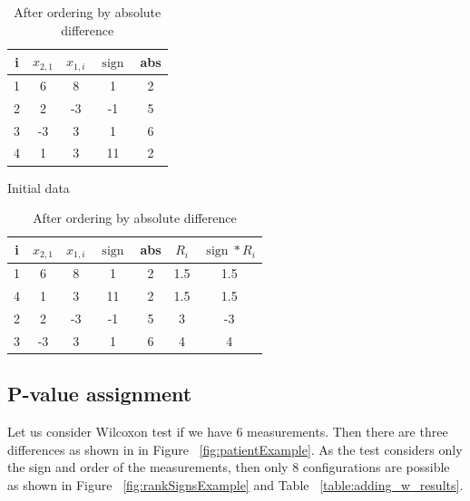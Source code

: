 \documentclass[12pt]{article}
\DeclareMathOperator{\sign}{sign}
\begin{document}
\begin{table}[h!]
  \begin{center}
    \begin{minipage}{.5\linewidth}
      \begin{center}
        \begin{tabular}{ccccc}
          \hline
          i & $x_{2, 1}$ & $x_{1, i}$ & $\sign$ & abs \\
          \hline
          1 & 6 & 8 & 1 & 2 \\
          \hline
          2 & 2 & -3 & -1 & 5 \\
          \hline
          3 & -3 & 3 & 1 & 6 \\
          \hline
          4 & 1 & 3 & 11 & 2 \\
          \hline
        \end{tabular}
        \caption{Initial data}
        \label{table:wilx_example_1}
      \end{center}
    \end{minipage}%
    \begin{minipage}{.5\linewidth}
      \begin{center}
        \begin{tabular}{ccccccc}
          \hline
          i & $x_{2, 1}$ & $x_{1, i}$ & $\sign$ & abs & $R_i$ & $\sign * R_i$ \\
          \hline
          1 & 6 & 8 & 1 & 2 & 1.5 & 1.5\\
          \hline
          4 & 1 & 3 & 11 & 2 & 1.5 & 1.5\\
          \hline
          2 & 2 & -3 & -1 & 5 & 3 & -3 \\
          \hline
          3 & -3 & 3 & 1 & 6 & 4 & 4\\
          \hline
        \end{tabular}
        \caption{After ordering by absolute difference}
        \label{table:wilx_example_2}
      \end{center}
    \end{minipage}%
  \end{center}
\end{table}


\subsection{P-value assignment}
Let us consider Wilcoxon test if we have 6 measurements. Then there are three differences as shown in in Figure ~\ref{fig:patientExample}. As the test considers only the sign and order of the measurements, then only 8 configurations are possible as shown in Figure ~\ref{fig:rankSignsExample} and Table ~\ref{table:adding_w_results}.
\end{document}
